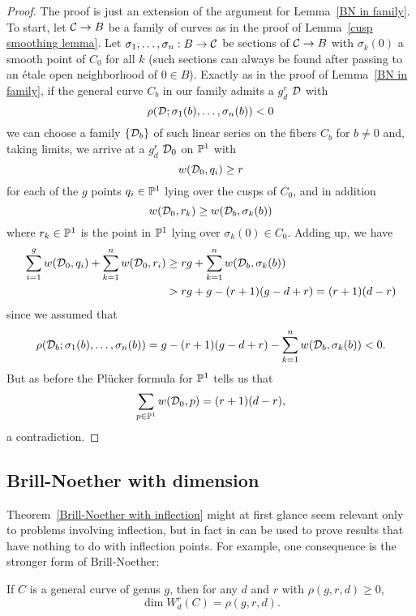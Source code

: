 \begin{proof}
The proof is just an extension of the argument for Lemma~\ref{BN in family}. To start, let $\mathcal C \to B$ be a family of curves as in the proof of Lemma~\ref{cusp smoothing lemma}. Let $\sigma_1, \dots, \sigma_n : B \to \mathcal C$ be sections of $\mathcal C \to B$ with $\sigma_k(0)$ a smooth point of $C_0$ for all $k$ (such sections can always be found after passing to an \'etale open neighborhood of $0 \in B$). Exactly as in the proof of Lemma~\ref{BN in family}, if the general curve $C_b$ in our family admits a $g^r_d$ ${\mathcal D}$ with
$$
\rho({\mathcal D};\sigma_1(b),\dots,\sigma_n(b)) < 0
$$
we can choose a family $\{{\mathcal D}_b\}$ of such linear series on the fibers $C_b$ for $b \neq 0$ and, taking limits, we arrive at a $g^r_d$ ${\mathcal D}_0$ on ${\mathbb P}^1$ with
$$
w({\mathcal D}_0, q_i) \geq r
$$
for each of the $g$ points $q_i \in {\mathbb P}^1$ lying over the cusps of $C_0$, and in addition
$$
w({\mathcal D}_0, r_k) \geq w({\mathcal D}_b,\sigma_k(b))
$$
where $r_k \in {\mathbb P}^1$ is the point in ${\mathbb P}^1$ lying over $\sigma_k(0) \in C_0$. Adding up, we have
\begin{align*}
\sum_{i=1}^g w({\mathcal D}_0, q_i) + \sum_{k=1}^n w({\mathcal D}_0, r_i) &\geq rg + \sum_{k=1}^n w({\mathcal D}_b,\sigma_k(b)) \\
&> rg + g - (r+1)(g-d+r) = (r+1)(d-r)
\end{align*}
since we assumed that 
$$
\rho({\mathcal D}_b;\sigma_1(b),\dots,\sigma_n(b)) = g - (r+1)(g-d+r) - \sum_{k=1}^n w({\mathcal D}_b,\sigma_k(b)) < 0.
$$
But as before the Pl\"ucker formula for ${\mathbb P}^1$ tells us that
$$
\sum_{p \in {\mathbb P}^1} w({\mathcal D}_0, p) = (r+1)(d-r),
$$
a contradiction.
\end{proof}

\subsection{Brill-Noether with dimension}

Theorem~\ref{Brill-Noether with inflection} might at first glance seem relevant only to problems involving inflection, but in fact in can be used to prove results that have nothing to do with inflection points. For example, one consequence is the stronger form of Brill-Noether:

\begin{theorem}\label{BN with dimension}
If $C$ is a general curve of genus $g$, then for any $d$ and $r$ with $\rho(g,r,d) \geq 0$,
$$
\dim W^r_d(C) = \rho(g,r,d).
$$
\end{theorem}

